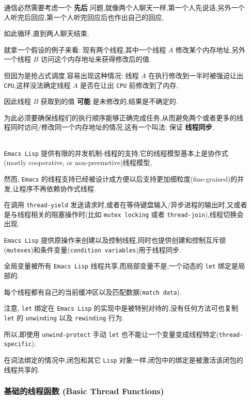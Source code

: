 \documentclass[11pt]{article}
\begin{document}
通信必然需要考虑一个 \textbf{先后} 问题,就像两个人聊天一样,第一个人先说话,另外一个人听完后回应,第一个人听完回应后也作出自己的回应,

如此循环,直到两人聊天结束.

就拿一个假设的例子来看: 现有两个线程,其中一个线程 \(A\) 修改某个内存地址,另外一个线程 \(B\) 访问这个内存地址来获得修改后的值.

但因为是抢占式调度,容易出现这种情况: 线程 \(A\) 在执行修改到一半时被强迫让出 \texttt{CPU},这样没法确定线程 \(A\) 是否在让出 \texttt{CPU} 前修改到了内存,

因此线程 \(B\) 获取到的值 \textbf{可能} 是未修改的,结果是不确定的.

为此必须要确保线程们的执行顺序能够正确完成任务,从而避免两个或者更多的线程同时访问/修改同一个内存地址的情况,这有一个叫法: 保证 \textbf{线程同步}.

\\[0pt]

\texttt{Emacs Lisp} 提供有限的并发机制-线程的支持,它的线程模型基本上是协作式(mostly cooperative, or non-preemetive)线程模型,

然而, \texttt{Emacs} 的线程支持已经被设计成方便以后支持更加细粒度(fine-grained)的并发,让程序不再依赖协作式线程.

在调用 \texttt{thread-yield} 发送请求时,或者在等待键盘输入/异步进程的输出时,又或者是与线程相关的阻塞操作时(比如 \texttt{mutex locking} 或者 \texttt{thread-join}),线程切换会出现.

\texttt{Emacs Lisp} 提供原操作来创建以及控制线程,同时也提供创建和控制互斥锁(\texttt{mutexes})和条件变量(\texttt{condition variables})用于线程同步.

全局变量被所有 \texttt{Emacs Lisp} 线程共享,而局部变量不是,一个动态的 \texttt{let} 绑定是局部的.

每个线程都有自己的当前缓冲区以及匹配数据(\texttt{match data}).

注意, \texttt{let} 绑定在 \texttt{Emacs Lisp} 的实现中是被特别对待的,没有任何方法可也复制 \texttt{let} 的 \texttt{unwinding} 以及 \texttt{rewinding} 行为.

所以,即使用 \texttt{unwind-protect} 手动 \texttt{let} 也不能让一个变量变成线程特定(\texttt{thread-specific}).

在词法绑定的情况中,闭包和其它 \texttt{Lisp} 对象一样,闭包中的绑定是被激活该闭包的线程共享的.

\subsubsection{基础的线程函数 (Basic Thread Functions)}
\label{sec:orgd4dd915}
\end{document}
